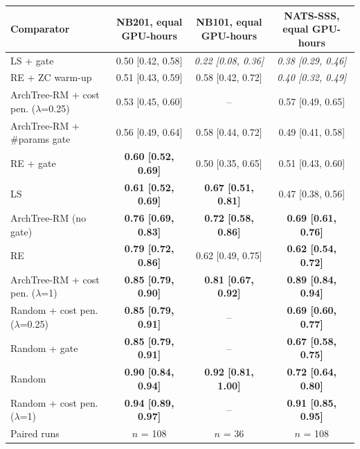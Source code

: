 \begin{tabular}{@{}lccc@{}}
\toprule
Comparator & NB201, equal GPU-hours & NB101, equal GPU-hours & NATS-SSS, equal GPU-hours\\
\midrule
LS + gate & 0.50 [0.42, 0.58] & \textit{0.22 [0.08, 0.36]} & \textit{0.38 [0.29, 0.46]}\\
RE + ZC warm-up & 0.51 [0.43, 0.59] & 0.58 [0.42, 0.72] & \textit{0.40 [0.32, 0.49]}\\
ArchTree-RM + cost pen. ($\lambda$=0.25) & 0.53 [0.45, 0.60] & -- & 0.57 [0.49, 0.65]\\
ArchTree-RM + \#params gate & 0.56 [0.49, 0.64] & 0.58 [0.44, 0.72] & 0.49 [0.41, 0.58]\\
RE + gate & \textbf{0.60 [0.52, 0.69]} & 0.50 [0.35, 0.65] & 0.51 [0.43, 0.60]\\
LS & \textbf{0.61 [0.52, 0.69]} & \textbf{0.67 [0.51, 0.81]} & 0.47 [0.38, 0.56]\\
ArchTree-RM (no gate) & \textbf{0.76 [0.69, 0.83]} & \textbf{0.72 [0.58, 0.86]} & \textbf{0.69 [0.61, 0.76]}\\
RE & \textbf{0.79 [0.72, 0.86]} & 0.62 [0.49, 0.75] & \textbf{0.62 [0.54, 0.72]}\\
ArchTree-RM + cost pen. ($\lambda$=1) & \textbf{0.85 [0.79, 0.90]} & \textbf{0.81 [0.67, 0.92]} & \textbf{0.89 [0.84, 0.94]}\\
Random + cost pen. ($\lambda$=0.25) & \textbf{0.85 [0.79, 0.91]} & -- & \textbf{0.69 [0.60, 0.77]}\\
Random + gate & \textbf{0.85 [0.79, 0.91]} & -- & \textbf{0.67 [0.58, 0.75]}\\
Random & \textbf{0.90 [0.84, 0.94]} & \textbf{0.92 [0.81, 1.00]} & \textbf{0.72 [0.64, 0.80]}\\
Random + cost pen. ($\lambda$=1) & \textbf{0.94 [0.89, 0.97]} & -- & \textbf{0.91 [0.85, 0.95]}\\
\midrule
Paired runs & $n$ = 108 & $n$ = 36 & $n$ = 108\\
\bottomrule
\end{tabular}
